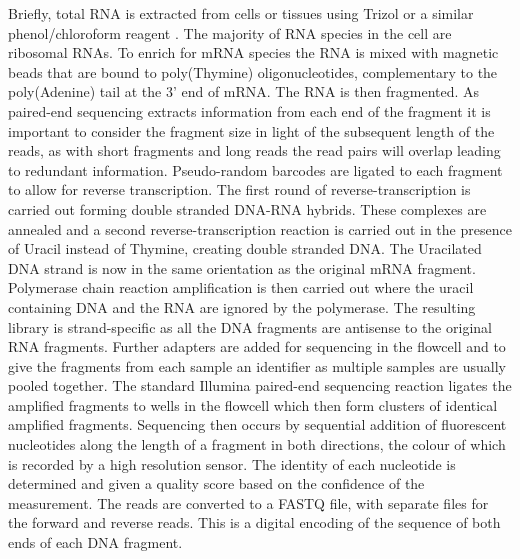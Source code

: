 Briefly, total RNA is extracted from cells or tissues using Trizol or a similar phenol/chloroform reagent \citep{Chomczynski1987}. The majority of RNA species in the cell are ribosomal RNAs. To enrich for mRNA species the RNA is mixed with magnetic beads that are bound to poly(Thymine) oligonucleotides, complementary to the poly(Adenine) tail at the 3' end of mRNA. The RNA is then fragmented. As paired-end sequencing extracts information from each end of the fragment it is important to consider the fragment size in light of the subsequent length of the reads, as with short fragments and long reads the read pairs will overlap leading to redundant information. Pseudo-random barcodes are ligated to each fragment to allow for reverse transcription. The first round of reverse-transcription is carried out forming double stranded DNA-RNA hybrids. These complexes are annealed and a second reverse-transcription reaction is carried out in the presence of Uracil instead of Thymine, creating double stranded DNA. The Uracilated DNA strand is now in the same orientation as the original mRNA fragment. Polymerase chain reaction amplification is then carried out where the uracil containing DNA and the RNA are ignored by the polymerase. The resulting library is strand-specific as all the DNA fragments are antisense to the original RNA fragments. Further adapters are added for sequencing in the flowcell and to give the fragments from each sample an identifier as multiple samples are usually pooled together. 
The standard Illumina paired-end sequencing reaction ligates the amplified fragments to wells in the flowcell which then form clusters of identical amplified fragments. Sequencing then occurs by sequential addition of fluorescent nucleotides along the length of a fragment in both directions, the  colour of which is recorded by a high resolution sensor. The identity of each nucleotide is determined and given a quality score based on the confidence of the measurement. The reads are converted to a FASTQ file, with separate files for the forward and reverse reads. This is a digital encoding of the sequence of both ends of each DNA fragment.

